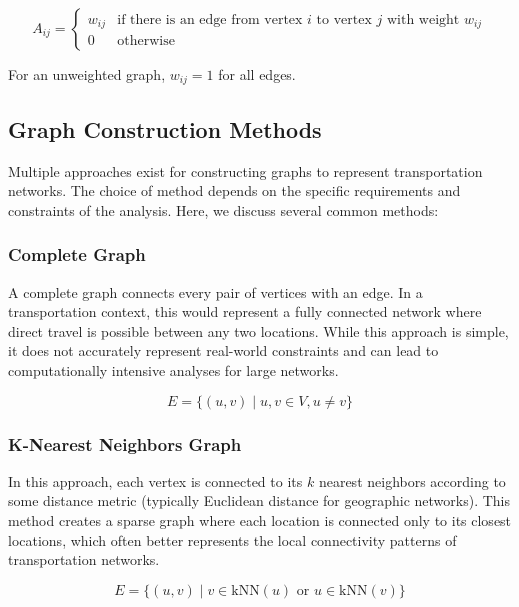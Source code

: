 \begin{equation}
    A_{ij} = 
    \begin{cases} 
        w_{ij} & \text{if there is an edge from vertex $i$ to vertex $j$ with weight $w_{ij}$} \\
        0 & \text{otherwise}
    \end{cases}
\end{equation}

For an unweighted graph, $w_{ij} = 1$ for all edges.

\subsection{Graph Construction Methods}
\label{subsec:GraphConstructionMethods}

Multiple approaches exist for constructing graphs to represent transportation networks. The choice of method depends on the specific requirements and constraints of the analysis. Here, we discuss several common methods:

\subsubsection{Complete Graph}
A complete graph connects every pair of vertices with an edge. In a transportation context, this would represent a fully connected network where direct travel is possible between any two locations. While this approach is simple, it does not accurately represent real-world constraints and can lead to computationally intensive analyses for large networks.

\begin{equation}
    E = \{(u, v) \mid u, v \in V, u \neq v\}
\end{equation}

\subsubsection{K-Nearest Neighbors Graph}
In this approach, each vertex is connected to its $k$ nearest neighbors according to some distance metric (typically Euclidean distance for geographic networks). This method creates a sparse graph where each location is connected only to its closest locations, which often better represents the local connectivity patterns of transportation networks.

\begin{equation}
    E = \{(u, v) \mid v \in \text{kNN}(u) \text{ or } u \in \text{kNN}(v)\}
\end{equation}

